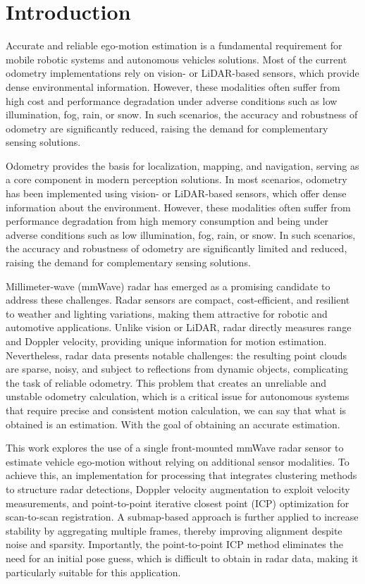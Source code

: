 \section{Introduction}
\label{sec:intoduction}

Accurate and reliable ego-motion estimation is a fundamental requirement for mobile robotic systems and autonomous vehicles solutions.
Most of the current odometry implementations rely on vision- or LiDAR-based sensors, which provide dense environmental information.
However, these modalities often suffer from high cost and performance degradation under adverse conditions such as low illumination, fog, rain, or snow.
In such scenarios, the accuracy and robustness of odometry are significantly reduced, raising the demand for complementary sensing solutions.

Odometry provides the basis for localization, mapping, and navigation, serving as a core component in modern perception solutions.  
In most scenarios, odometry has been implemented using vision- or LiDAR-based sensors, which offer dense information about the environment.  
However, these modalities often suffer from performance degradation from high memory consumption and being under adverse conditions such as low illumination, fog, rain, or snow.  
In such scenarios, the accuracy and robustness of odometry are significantly limited and reduced, raising the demand for complementary sensing solutions.  

Millimeter-wave (mmWave) radar has emerged as a promising candidate to address these challenges.  
Radar sensors are compact, cost-efficient, and resilient to weather and lighting variations, making them attractive for robotic and automotive applications.  
Unlike vision or LiDAR, radar directly measures range and Doppler velocity, providing unique information for motion estimation.  
Nevertheless, radar data presents notable challenges: the resulting point clouds are sparse, noisy, and subject to reflections from dynamic objects, complicating the task of reliable odometry.  
This problem that creates an unreliable and unstable odometry calculation, which is a critical issue for autonomous systems that require precise and consistent motion calculation, we can say that what is obtained is an estimation.
With the goal of obtaining an accurate estimation.

This work explores the use of a single front-mounted mmWave radar sensor to estimate vehicle ego-motion without relying on additional sensor modalities.  
To achieve this, an implementation for processing that integrates clustering methods to structure radar detections, Doppler velocity augmentation to exploit velocity measurements, and point-to-point iterative closest point (ICP) optimization for scan-to-scan registration.  
A submap-based approach is further applied to increase stability by aggregating multiple frames, thereby improving alignment despite noise and sparsity.  
Importantly, the point-to-point ICP method eliminates the need for an initial pose guess, which is difficult to obtain in radar data, making it particularly suitable for this application.  


